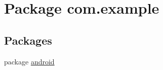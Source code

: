 \hypertarget{namespacecom_1_1example}{\section{Package com.\-example}
\label{namespacecom_1_1example}
}
\subsection*{Packages}
\begin{DoxyCompactItemize}
\item 
package \hyperlink{namespacecom_1_1example_1_1android}{android}
\end{DoxyCompactItemize}
